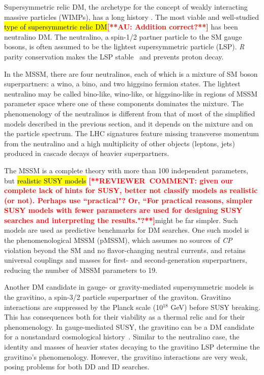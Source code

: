 \documentclass{ar-1col}
\begin{document}
Supersymmetric relic DM, the archetype for the concept of weakly interacting massive particles (WIMPs),
has a long history \cite{1984NuPhB.238..453E}. The most
viable and well-studied \hl{type of supersymmetric relic DM}\textbf{\textcolor{red}{[**AU: Addition correct?**]}} has been neutralino DM. The
neutralino, a spin-1/2 partner particle to the SM gauge bosons, is
often assumed to be the lightest supersymmetric particle (LSP).
\textit{R} parity conservation makes the LSP stable~\cite{Farrar:1978xj}
and prevents proton decay.

In the MSSM, there are four neutralinos, each of which is a mixture of SM boson
superpartners: a wino, a bino, and two higgsino fermion states.
The lightest neutralino may be called bino-like, wino-like, or
higgsino-like in regions of MSSM parameter space where one of
these components dominates the mixture. The phenomenology of the neutralinos is different from that of most of the simplified models described in the previous
section, and it depends on the mixture and on the particle spectrum.
The LHC signatures feature missing transverse momentum from the
neutralino and a high multiplicity of other objects (leptons,
jets) produced in cascade decays of heavier superpartners.

The MSSM is a complete theory with more than 100 independent
parameters, but \hl{realistic SUSY models} \textbf{\textcolor{red}{[**REVIEWER\ COMMENT: given our complete lack of hints for SUSY, better not classify models as realistic (or not).  Perhaps use ``practical"?  Or, ``For practical reasons, simpler SUSY models with fewer parameters are used for designing SUSY searches and interpreting the results."?**]}}might be far simpler. Such
models are used as predictive benchmarks for DM searches. One such model is the phenomenological MSSM (pMSSM), which assumes no
sources of \textit{CP} violation beyond the SM and no flavor-changing neutral
currents, and retains universal couplings and masses for first- and
second-generation superpartners, reducing the number of MSSM
parameters to 19.

Another DM candidate in gauge- or gravity-mediated supersymmetric
models is the gravitino, a spin-3/2 particle superpartner of the
graviton. Gravitino interactions are suppressed by the Planck
scale (10$^{18}$ GeV) before SUSY breaking. This has consequences
both for their viability as a thermal relic and for their
phenomenology. In gauge-mediated SUSY, the gravitino can be a DM
candidate for a nonstandard cosmological
history~\cite{Dimopoulos:1996vz}. Similar to the neutralino case,
the identity and masses of heavier states decaying to the
gravitino LSP determine the gravitino's phenomenology. However, the gravitino
interactions are very weak, posing problems for both DD and
ID searches.
\end{document}

